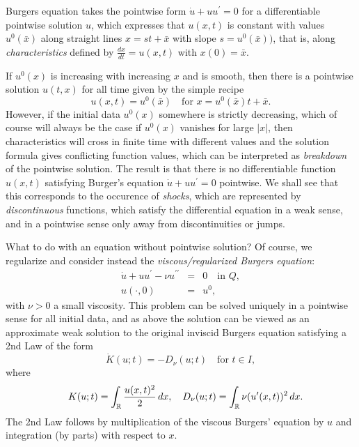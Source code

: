 Burgers equation takes the pointwise form 
$\dot u+uu^\prime=0$ for a differentiable  pointwise solution $u$, which  
expresses that $u(x,t)$ is constant with values $u^0(\bar x)$
along straight lines $x=st+\bar x$ with slope $s=u^0(\bar x))$,
that is, along \emph{characteristics} defined by $\frac{dx}{dt}=u(x,t)$
with $x(0)=\bar x$. 

If $u^0(x)$ is increasing with increasing $x$ and is smooth, 
then there is a pointwise solution $u(t,x)$ for all time given by
the simple recipe 
\begin{equation}\label{uxu0}
u(x,t)=u^0(\bar x)\quad\mbox{for }
x=u^0(\bar x)t+\bar x.
\end{equation}
However, if the initial data $u^0(x)$ somewhere is
strictly decreasing, which of course will always be the case if 
$u^0(x)$ vanishes for large $\vert x\vert$, then characteristics will 
cross in finite time with different values and the solution 
formula gives conflicting function values, which can be 
interpreted as \emph{breakdown} of the pointwise solution. 
The result is 
that there is no differentiable function $u(x,t)$ satisfying
Burger's equation $\dot u+uu^\prime =0$ pointwise. 
We shall see
that this corresponds to the occurence of \emph{shocks}, 
which are represented by \emph{discontinuous} functions,
which satisfy the differential equation in a weak sense,
and in a pointwise sense only away from discontinuities
or jumps. 


What to do with an equation without pointwise solution? 
Of course, we regularize and consider instead the 
\emph{viscous/regularized Burgers equation}:
\begin{equation}\label{burgersreg}
\begin{array}{rcl}
\dot u +uu^\prime  -\nu u^{\prime\prime}&=&  0\quad \mbox{in }Q,\\
u(\cdot ,0)  &=&  u^0,
\end{array}
\end{equation} 
with $\nu >0$ a small viscosity. This problem can be solved
uniquely in a pointwise sense for all initial data, 
and as above the solution can be viewed as an approximate weak
solution to the original inviscid Burgers equation satisfying a 2nd
Law of the form
\begin{equation}\label{2ndlawBurgers}
\dot K(u;t)=-D_\nu (u;t)\quad\mbox{for }t\in I,
\end{equation}
where
\begin{equation}\label{KD}
\quad K(u;t)=\int_{\mathbb{R}} \frac{u(x,t)^2}{2}\, dx,\quad
D_\nu (u;t)=\int_{\mathbb{R}}\nu (u^\prime (x,t))^2\, dx.
\end{equation} 
The 2nd Law follows by multiplication of the viscous
Burgers' equation by $u$ and integration (by parts) with respect to $x$.


